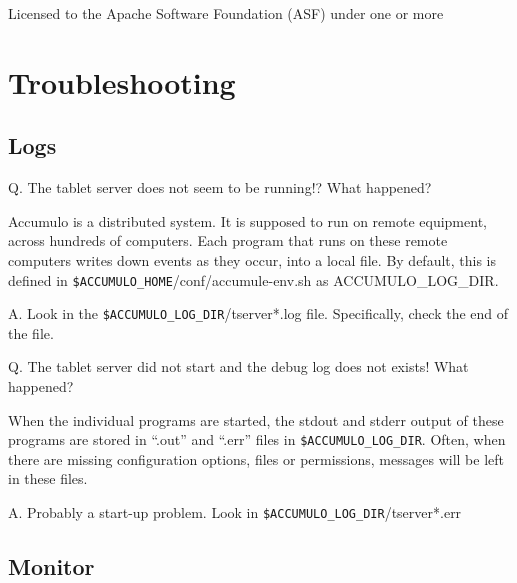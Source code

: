  Licensed to the Apache Software Foundation (ASF) under one or more
%
%

\chapter{Troubleshooting}

\section{Logs}

Q. The tablet server does not seem to be running!? What happened?

Accumulo is a distributed system.  It is supposed to run on remote
equipment, across hundreds of computers.  Each program that runs on
these remote computers writes down events as they occur, into a local
file. By default, this is defined in
\texttt{\$ACCUMULO\_HOME}/conf/accumule-env.sh as ACCUMULO\_LOG\_DIR.

A. Look in the \texttt{\$ACCUMULO\_LOG\_DIR}/tserver*.log file.  Specifically, check the end of the file.

Q. The tablet server did not start and the debug log does not exists!  What happened?

When the individual programs are started, the stdout and stderr output
of these programs are stored in ``.out'' and ``.err'' files in
\texttt{\$ACCUMULO\_LOG\_DIR}.  Often, when there are missing configuration
options, files or permissions, messages will be left in these files.

A. Probably a start-up problem.  Look in \texttt{\$ACCUMULO\_LOG\_DIR}/tserver*.err

\section{Monitor}

